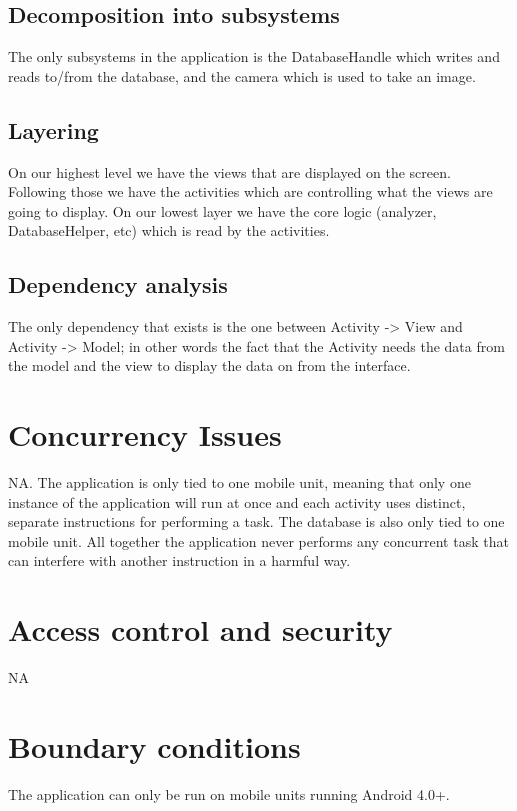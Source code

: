\documentclass{report}
\begin{document}
\subsection{Decomposition into subsystems}
The only subsystems in the application is the DatabaseHandle which writes and reads to/from the database, and the camera which is used to take an image. 

\subsection{Layering}
On our highest level we have the views that are displayed on the screen. Following those we have the activities which are controlling what the views are going to display. On our lowest layer we have the core logic (analyzer, DatabaseHelper, etc) which is read by the activities.

\subsection{Dependency analysis}
The only dependency that exists is the one between Activity -> View and Activity -> Model; in other words the fact that the Activity needs the data from the model and the view to display the data on from the interface.

\pagebreak

\section{Concurrency Issues}
NA. The application is only tied to one mobile unit, meaning that only one instance of the application will run at once and each activity uses distinct, separate instructions for performing a task. The database is also only tied to one mobile unit. All together the application never performs any concurrent task that can interfere with another instruction in a harmful way. 


\section{Access control and security}
NA

\section{Boundary conditions}
The application can only be run on mobile units running Android 4.0+.





\appendix
\end{document}
